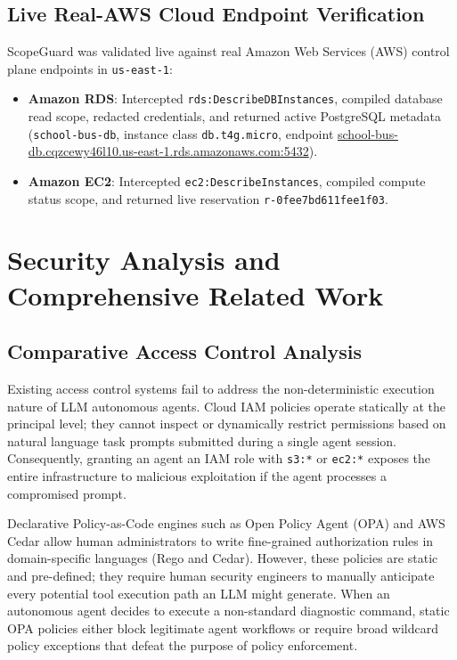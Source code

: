 \documentclass[conference]{IEEEtran}
\begin{document}
\subsection{Live Real-AWS Cloud Endpoint Verification}
ScopeGuard was validated live against real Amazon Web Services (AWS) control plane endpoints in \texttt{us-east-1}:
\begin{itemize}
    \item \textbf{Amazon RDS}: Intercepted \texttt{rds:DescribeDBInstances}, compiled database read scope, redacted credentials, and returned active PostgreSQL metadata (\texttt{school-bus-db}, instance class \texttt{db.t4g.micro}, endpoint \url{school-bus-db.cqzcewy46l10.us-east-1.rds.amazonaws.com:5432}).
    \item \textbf{Amazon EC2}: Intercepted \texttt{ec2:DescribeInstances}, compiled compute status scope, and returned live reservation \texttt{r-0fee7bd611fee1f03}.
\end{itemize}

\FloatBarrier

\section{Security Analysis and Comprehensive Related Work}\label{sec:discussion}

\subsection{Comparative Access Control Analysis}
Existing access control systems fail to address the non-deterministic execution nature of LLM autonomous agents. Cloud IAM policies operate statically at the principal level; they cannot inspect or dynamically restrict permissions based on natural language task prompts submitted during a single agent session. Consequently, granting an agent an IAM role with \texttt{s3:*} or \texttt{ec2:*} exposes the entire infrastructure to malicious exploitation if the agent processes a compromised prompt.

Declarative Policy-as-Code engines such as Open Policy Agent (OPA) and AWS Cedar allow human administrators to write fine-grained authorization rules in domain-specific languages (Rego and Cedar). However, these policies are static and pre-defined; they require human security engineers to manually anticipate every potential tool execution path an LLM might generate. When an autonomous agent decides to execute a non-standard diagnostic command, static OPA policies either block legitimate agent workflows or require broad wildcard policy exceptions that defeat the purpose of policy enforcement.
\end{document}
